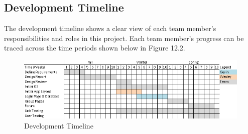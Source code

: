 \documentclass{scu-thesis}
\begin{document}
\begin{appendices}
	\section{Development Timeline}
	The development timeline shows a clear view of each team member’s responsibilities and roles in this project. Each team member’s progress can be traced across the time periods shown below in Figure 12.2.
	
	\begin{figure}[h]
		\includegraphics[width=\linewidth]{images/timeline.png}
		\caption{Development Timeline}
		\label{fig:timeline}
		\centering
	\end{figure}
\end{appendices}

\backmatter
\end{document}

